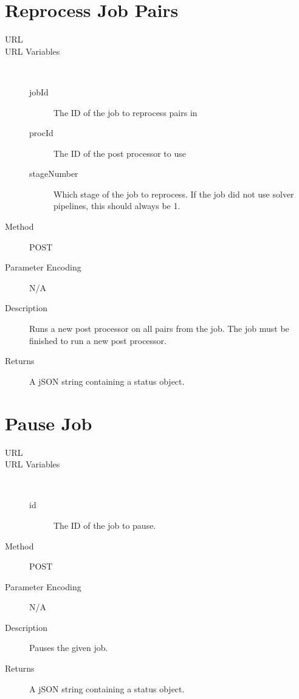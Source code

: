 \section{Reprocess Job Pairs}
\begin{description}
\item [URL] 
\item [URL Variables] \
	\begin{description}
	\item [jobId]  The ID of the job to reprocess pairs in
	\item [procId]  The ID of the post processor to use
	\item [stageNumber] \type{Integer} Which stage of the job to reprocess. If the job did not use solver pipelines, this should always be 1.
	\end{description}
\item [Method] POST
\item [Parameter Encoding] N/A
\item [Description] Runs a new post processor on all pairs from the job. The job must be finished to run a new post processor.
\item [Returns] A jSON string containing a status object.
\end{description}


\section{Pause Job}
\begin{description}
\item [URL] 
\item [URL Variables] \
	\begin{description}
	\item [id]  The ID of the job to pause.
	\end{description}
\item [Method] POST
\item [Parameter Encoding] N/A
\item [Description] Pauses the given job.
\item [Returns] A jSON string containing a status object.
\end{description}


